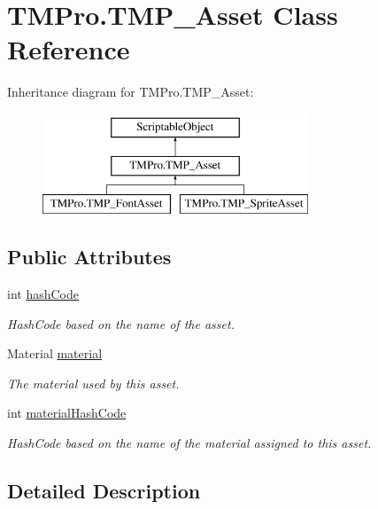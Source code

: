 \hypertarget{class_t_m_pro_1_1_t_m_p___asset}{}\section{T\+M\+Pro.\+T\+M\+P\+\_\+\+Asset Class Reference}
\label{class_t_m_pro_1_1_t_m_p___asset}
Inheritance diagram for T\+M\+Pro.\+T\+M\+P\+\_\+\+Asset\+:\begin{figure}[H]
\begin{center}
\leavevmode
\includegraphics[height=3.000000cm]{class_t_m_pro_1_1_t_m_p___asset}
\end{center}
\end{figure}
\subsection*{Public Attributes}
\begin{DoxyCompactItemize}
\item 
int \mbox{\hyperlink{class_t_m_pro_1_1_t_m_p___asset_a63f177ff7028859d2b431789737d8ccc}{hash\+Code}}
\begin{DoxyCompactList}\small\item\em Hash\+Code based on the name of the asset. \end{DoxyCompactList}\item 
Material \mbox{\hyperlink{class_t_m_pro_1_1_t_m_p___asset_a8dcd405969e8c3aaa441c0fe3b0b6eaa}{material}}
\begin{DoxyCompactList}\small\item\em The material used by this asset. \end{DoxyCompactList}\item 
int \mbox{\hyperlink{class_t_m_pro_1_1_t_m_p___asset_a55abe9aef1cf6d3e49fec1257abd152c}{material\+Hash\+Code}}
\begin{DoxyCompactList}\small\item\em Hash\+Code based on the name of the material assigned to this asset. \end{DoxyCompactList}\end{DoxyCompactItemize}


\subsection{Detailed Description}


